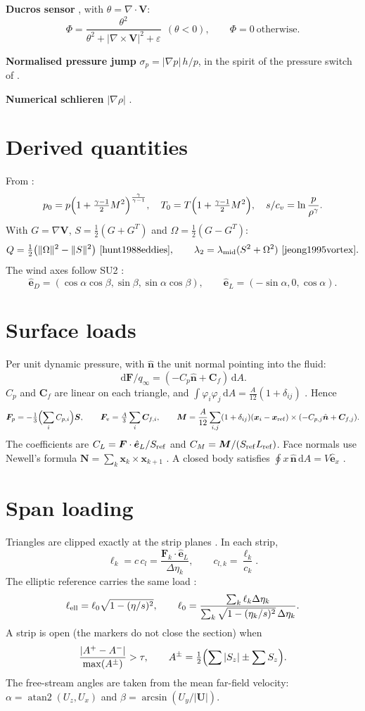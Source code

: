 \documentclass[10pt,a4paper]{article}
\newcommand{\vect}[1]{\bm{#1}}
\newcommand{\dd}{\,\mathrm{d}}
\begin{document}
\textbf{Ducros sensor} \cite{ducros1999les}, with $\theta=\nabla\cdot\vect V$:
\[
  \Phi=\frac{\theta^2}{\theta^2+|\nabla\times\vect V|^2+\varepsilon}\ \ (\theta<0),\qquad \Phi=0\ \text{otherwise}.
\]

\textbf{Normalised pressure jump} $\sigma_p=|\nabla p|\,h/p$, in the spirit of the pressure
switch of \cite{jameson1981jst}.

\textbf{Numerical schlieren} $|\nabla\rho|$ \cite{yates1993images}.

\section*{Derived quantities}
From \cite{anderson2003compressible}:
\[
  p_0=p\Bigl(1+\tfrac{\gamma-1}{2}M^2\Bigr)^{\frac{\gamma}{\gamma-1}},\quad
  T_0=T\Bigl(1+\tfrac{\gamma-1}{2}M^2\Bigr),\quad
  s/c_v=\ln\frac{p}{\rho^\gamma}.
\]
With $G=\nabla\vect V$, $S=\tfrac12(G+G^T)$ and $\Omega=\tfrac12(G-G^T)$:
\[
  Q=\tfrac12\bigl(\|\Omega\|^2-\|S\|^2\bigr)\ \text{\cite{hunt1988eddies}},\qquad
  \lambda_2=\lambda_{\text{mid}}(S^2+\Omega^2)\ \text{\cite{jeong1995vortex}}.
\]
The wind axes follow SU2 \cite{economon2016su2}:
\[
  \hat{\vect e}_D=(\cos\alpha\cos\beta,\sin\beta,\sin\alpha\cos\beta),\qquad
  \hat{\vect e}_L=(-\sin\alpha,0,\cos\alpha).
\]

\section*{Surface loads}
Per unit dynamic pressure, with $\hat{\vect n}$ the unit normal pointing into the fluid:
\[
  \dd\vect F/q_\infty=(-C_p\hat{\vect n}+\vect C_f)\dd A .
\]
$C_p$ and $\vect C_f$ are linear on each triangle, and
$\int\varphi_i\varphi_j\dd A=\tfrac{A}{12}(1+\delta_{ij})$ \cite{zienkiewicz2013fem}. Hence
\[
  \vect F_p=-\tfrac13\Bigl(\sum_i C_{p,i}\Bigr)\vect S,\qquad
  \vect F_v=\tfrac A3\sum_i\vect C_{f,i},\qquad
  \vect M=\frac{A}{12}\sum_{i,j}(1+\delta_{ij})(\vect x_i-\vect x_{\rm ref})\times(-C_{p,j}\hat{\vect n}+\vect C_{f,j}).
\]
The coefficients are $C_L=\vect F\cdot\hat{\vect e}_L/S_{\rm ref}$ and
$C_M=\vect M/(S_{\rm ref}L_{\rm ref})$. Face normals use Newell's formula
$\vect N=\sum_k\vect x_k\times\vect x_{k+1}$ \cite{sutherland1974hidden}. A closed body
satisfies $\oint x\,\hat{\vect n}\dd A=V\hat{\vect e}_x$ \cite{mirtich1996mass}.

\section*{Span loading}
Triangles are clipped exactly at the strip planes \cite{sutherland1974clipping}. In each strip,
\[
  \ell_k=c\,c_l=\frac{\vect F_k\cdot\hat{\vect e}_L}{\Delta\eta_k},\qquad c_{l,k}=\frac{\ell_k}{c_k}.
\]
The elliptic reference carries the same load \cite{anderson2017fundamentals}:
\[
  \ell_{\rm ell}=\ell_0\sqrt{1-(\eta/s)^2},\qquad
  \ell_0=\frac{\sum_k\ell_k\Delta\eta_k}{\sum_k\sqrt{1-(\eta_k/s)^2}\,\Delta\eta_k}.
\]
A strip is open (the markers do not close the section) when
\[
  \frac{|A^+-A^-|}{\max(A^\pm)}>\tau,\qquad A^\pm=\tfrac12\Bigl(\sum|S_z|\pm\sum S_z\Bigr).
\]
The free-stream angles are taken from the mean far-field velocity:
$\alpha=\operatorname{atan2}(U_z,U_x)$ and $\beta=\arcsin(U_y/|\vect U|)$.
\end{document}

